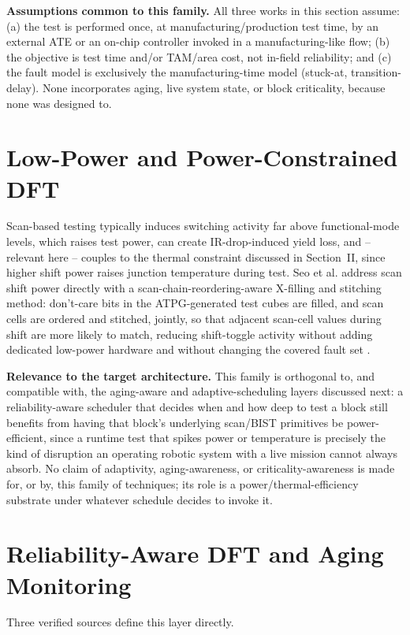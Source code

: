 \documentclass[journal]{IEEEtran}
\begin{document}
\textbf{Assumptions common to this family.} All three works in this section assume: (a) the test is performed once, at manufacturing/production test time, by an external ATE or an on-chip controller invoked in a manufacturing-like flow; (b) the objective is test time and/or TAM/area cost, not in-field reliability; and (c) the fault model is exclusively the manufacturing-time model (stuck-at, transition-delay). None incorporates aging, live system state, or block criticality, because none was designed to.

\section{Low-Power and Power-Constrained DFT}
Scan-based testing typically induces switching activity far above functional-mode levels, which raises test power, can create IR-drop-induced yield loss, and -- relevant here -- couples to the thermal constraint discussed in Section~II, since higher shift power raises junction temperature during test. Seo et al. address scan shift power directly with a scan-chain-reordering-aware X-filling and stitching method: don't-care bits in the ATPG-generated test cubes are filled, and scan cells are ordered and stitched, jointly, so that adjacent scan-cell values during shift are more likely to match, reducing shift-toggle activity without adding dedicated low-power hardware and without changing the covered fault set \cite{r11}.

\textbf{Relevance to the target architecture.} This family is orthogonal to, and compatible with, the aging-aware and adaptive-scheduling layers discussed next: a reliability-aware scheduler that decides when and how deep to test a block still benefits from having that block's underlying scan/BIST primitives be power-efficient, since a runtime test that spikes power or temperature is precisely the kind of disruption an operating robotic system with a live mission cannot always absorb. No claim of adaptivity, aging-awareness, or criticality-awareness is made for, or by, this family of techniques; its role is a power/thermal-efficiency substrate under whatever schedule decides to invoke it.

\section{Reliability-Aware DFT and Aging Monitoring}
Three verified sources define this layer directly.
\end{document}
